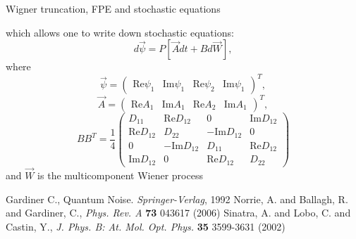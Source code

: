 \documentclass[final,hyperref={pdfpagelabels=false}]{beamer}
\begin{document}
\begin{frame}
\begin{columns}
{\begin{block}{Wigner truncation, FPE and stochastic equations}
\begin{itemize}
		which allows one to write down stochastic equations:
\[ d \vec{\psi} = P \left[ \vec{A} dt + B d\vec{W} \right], \]
where
\[ \vec{\psi} = \begin{pmatrix} \textrm{Re} \psi_1 & \textrm{Im} \psi_1 & \textrm{Re} \psi_2 & \textrm{Im} \psi_1 \end{pmatrix}^T, \]
\[ \vec{A} = \begin{pmatrix} \textrm{Re} A_1 & \textrm{Im} A_1 & \textrm{Re} A_2 & \textrm{Im} A_1 \end{pmatrix}^T, \]
\[
\newcommand{\ta}{D_{11}}
\newcommand{\tb}{\textrm{Re}D_{12}}
\newcommand{\tc}{\textrm{Im}D_{12}}
\newcommand{\td}{D_{22}}
B B^T = \frac{1}{4} \begin{pmatrix}
\ta & \tb & 0 & \tc \\
\tb & \td & -\tc & 0 \\
0 & -\tc & \ta & \tb \\
\tc & 0 & \tb & \td
\end{pmatrix}
\]
and $\vec{W}$ is the multicomponent Wiener process
\end{itemize}

\tiny{ \begin{thebibliography}{9}
	 Gardiner C., Quantum Noise. \textit{Springer-Verlag}, 1992
	 Norrie, A. and Ballagh, R. and Gardiner, C., \textit{Phys. Rev. A} \textbf{73} 043617 (2006)
	 Sinatra, A. and Lobo, C. and Castin, Y., \textit{J. Phys. B: At. Mol. Opt. Phys.} \textbf{35} 3599-3631 (2002)
\end{thebibliography} }

\end{block}

}
\end{columns}
\end{frame}
\end{document}
